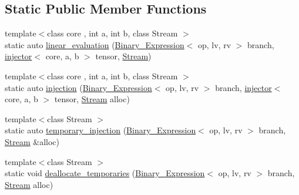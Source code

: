 \subsection*{Static Public Member Functions}
\begin{DoxyCompactItemize}
\item 
{\footnotesize template$<$class core , int a, int b, class Stream $>$ }\\static auto \hyperlink{structBC_1_1tensors_1_1exprs_1_1optimizer_3_01Binary__Expression_3_01op_00_01lv_00_01rv_01_4_00_11116ffe640829700a69ab4f1bad216e_ab55ef4de0332d7bf0a2ec9cb6514aa8a}{linear\+\_\+evaluation} (\hyperlink{structBC_1_1tensors_1_1exprs_1_1Binary__Expression}{Binary\+\_\+\+Expression}$<$ op, lv, rv $>$ branch, \hyperlink{structBC_1_1tensors_1_1exprs_1_1injector}{injector}$<$ core, a, b $>$ tensor, \hyperlink{namespaceBC_abc64a63cd29a22d102a68f478dfd588d}{Stream})
\item 
{\footnotesize template$<$class core , int a, int b, class Stream $>$ }\\static auto \hyperlink{structBC_1_1tensors_1_1exprs_1_1optimizer_3_01Binary__Expression_3_01op_00_01lv_00_01rv_01_4_00_11116ffe640829700a69ab4f1bad216e_a5d0d39bab01f9fb6b6305d2574b2bf90}{injection} (\hyperlink{structBC_1_1tensors_1_1exprs_1_1Binary__Expression}{Binary\+\_\+\+Expression}$<$ op, lv, rv $>$ branch, \hyperlink{structBC_1_1tensors_1_1exprs_1_1injector}{injector}$<$ core, a, b $>$ tensor, \hyperlink{namespaceBC_abc64a63cd29a22d102a68f478dfd588d}{Stream} alloc)
\item 
{\footnotesize template$<$class Stream $>$ }\\static auto \hyperlink{structBC_1_1tensors_1_1exprs_1_1optimizer_3_01Binary__Expression_3_01op_00_01lv_00_01rv_01_4_00_11116ffe640829700a69ab4f1bad216e_ad5ee927cc26e47e32a780033d618fd76}{temporary\+\_\+injection} (\hyperlink{structBC_1_1tensors_1_1exprs_1_1Binary__Expression}{Binary\+\_\+\+Expression}$<$ op, lv, rv $>$ branch, \hyperlink{namespaceBC_abc64a63cd29a22d102a68f478dfd588d}{Stream} \&alloc)
\item 
{\footnotesize template$<$class Stream $>$ }\\static void \hyperlink{structBC_1_1tensors_1_1exprs_1_1optimizer_3_01Binary__Expression_3_01op_00_01lv_00_01rv_01_4_00_11116ffe640829700a69ab4f1bad216e_a2ec05fb96e19faf3e86b1d0952a1ba74}{deallocate\+\_\+temporaries} (\hyperlink{structBC_1_1tensors_1_1exprs_1_1Binary__Expression}{Binary\+\_\+\+Expression}$<$ op, lv, rv $>$ branch, \hyperlink{namespaceBC_abc64a63cd29a22d102a68f478dfd588d}{Stream} alloc)
\end{DoxyCompactItemize}
